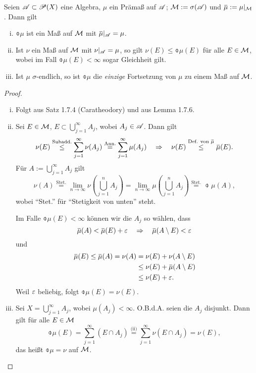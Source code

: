\begin{thm}
 Seien $\mathscr{A} \subset \mathscr{P}(X)$ eine Algebra, $\mu$ ein Prämaß auf $\mathscr{A}$; $\mathcal{M} := \sigma(\mathscr{A})$ und $\obar{\mu} := \mu|_\meas$. Dann gilt
 \begin{enumerate}[(i)]
  \item $\obar{\mu}$ ist ein Maß auf $\mathcal{M}$ mit $\obar{\mu}|_\mA = \mu$.
  \item Ist $\nu$ ein Maß auf $\mathcal{M}$ mit $\nu |_{\mathscr{A}} = \mu$, so gilt $\nu(E) \le \obar{\mu}(E)$ für alle $E \in \mathcal{M}$, wobei im Fall $\obar{\mu}(E) < \infty$ sogar Gleichheit gilt\footnotemark.
  \item Ist $\mu$ $\sigma$-endlich, so ist $\obar{\mu}$ die \emph{einzige} Fortsetzung von $\mu$ zu einem Maß auf $\mathcal{M}$.
 \end{enumerate}
\end{thm}

\begin{proof}
 \begin{enumerate}[(i)]
  \item Folgt aus Satz 1.7.4 (Caratheodory) und aus Lemma 1.7.6.
  \item Sei $E \in \mathcal{M}$, $E \subset \bigcup_{j=1}^\infty A_j$, wobei $A_j \in \mathscr{A}$. Dann gilt
  \[ \nu(E) \overset{\text{Subadd.}}{\le} \sum_{j=1}^\infty \nu(A_j) \overset{\text{Ann.}}{=} \sum_{j=1}^\infty \mu(A_j) \qRq \nu(E) \overset{\text{Def. von }\obar{\mu}}{\le} \obar{\mu}(E). \]
  Für $A := \bigcup_{j=1}^\infty A_j$ gilt
  \[ \nu(A) \overset{\text{Stet.}}{=} \lim_{n \to \infty} \nu \left( \bigcup_{j=1}^n A_j \right) = \lim_{n \to \infty} \mu \left( \bigcup_{j=1}^n A_j \right) \overset{\text{Stet.}}{=} \obar{\mu}(A), \]
  wobei ``Stet.'' für ``Stetigkeit von unten'' steht. 
  
  Im Falle $\obar{\mu}(E) < \infty$ können wir die $A_j$ so wählen, dass
  \[ \obar{\mu}(A) < \obar{\mu}(E) + \eps \qRq \obar{\mu}( A \setminus E ) < \eps \]
  und
  \begin{align*}
   \obar{\mu}(E) \le \obar{\mu}(A) = \nu(A) &= \nu(E) + \nu(A \setminus E) \\
   &\le \nu(E) + \obar{\mu}(A \setminus E) \\
   &\le \nu(E) + \eps.
  \end{align*}
  Weil $\varepsilon$ beliebig, folgt $\obar{\mu}(E) = \nu(E)$.
  \item Sei $X = \bigcup_{j=1}^\infty A_j$, wobei $\mu(A_j) < \infty$. O.B.d.A. seien die $A_j$ disjunkt. Dann gilt für alle $E \in \mathcal{M}$
  \[ \obar{\mu}(E) = \sum_{j=1}^\infty (E \cap A_j) \overset{\text{(ii)}}{=} \sum_{j=1}^\infty \nu(E \cap A_j) = \nu(E), \]
  das heißt $\obar{\mu} = \nu$ auf $\mathcal{M}$. \qedhere
 \end{enumerate}
\end{proof}

